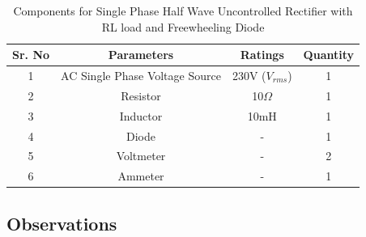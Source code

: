 \begin{table}[h]
    \renewcommand{\arraystretch}{1.3}
    \label{table_components_required_single-phase-half-wave-uncontrolled-rectifier-with-RL-load-and-freewheeling-diode}
    \centering
    \begin{tabular}{|c|c|c|c|}
        \hline
        Sr. No & Parameters                     & Ratings            & Quantity \\
        \hline
        \hline
        1      & AC Single Phase Voltage Source & 230V ($ V_{rms} $) & 1        \\
        \hline
        2      & Resistor                       & 10$ \Omega $       & 1        \\
        \hline
        3      & Inductor                       & 10mH               & 1        \\
        \hline
        4      & Diode                          & -                  & 1        \\
        \hline
        5      & Voltmeter                      & -                  & 2        \\
        \hline
        6      & Ammeter                        & -                  & 1        \\
        \hline
    \end{tabular}
    \caption{Components for Single Phase Half Wave Uncontrolled Rectifier with RL load and Freewheeling Diode}
\end{table}


\subsection{Observations}

